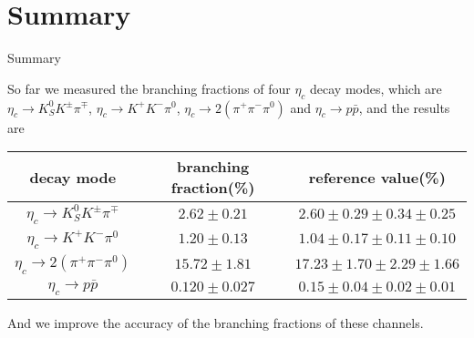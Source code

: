 \documentclass{beamer}
\begin{document}
\section{Summary}
\begin{frame}{Summary}
  \begin{block}{}
    So far we measured the branching fractions of four $\eta_c$ decay modes, which are $\eta_c\to K_S^0 K^{\pm} \pi^{\mp}$, $\eta_c\to K^+K^-\pi^0$, $\eta_c\to 2(\pi^+\pi^-\pi^0)$ and $\eta_c\to p\bar{p}$, and the results are
    \begin{table}[~hbp]\small
      \begin{tabular}{c|c|c}
        \hline
        \hline
        decay mode & branching fraction(\%) & reference value(\%) \footnotemark[1] \\
        \hline
        $\eta_c\to K_S^0K^{\pm}\pi^{\mp}$ & $2.62\pm0.21$ & $2.60\pm0.29\pm0.34\pm0.25$ \\
        $\eta_c\to K^+ K^- \pi^0$ & $1.20\pm0.13$ & $ 1.04\pm0.17\pm0.11\pm0.10$ \\
        $\eta_c\to2(\pi^+\pi^-\pi^0)$ & $15.72\pm1.81$ & $17.23\pm1.70\pm2.29\pm1.66$ \\
        $\eta_c\to p\bar{p}$ & $0.120\pm 0.027$  & $0.15\pm0.04\pm0.02\pm0.01$ \\
        \hline
        \hline
      \end{tabular}
    \end{table}
    And we improve the accuracy of the branching fractions of these channels.
  \end{block}
\end{frame}
\end{document}
